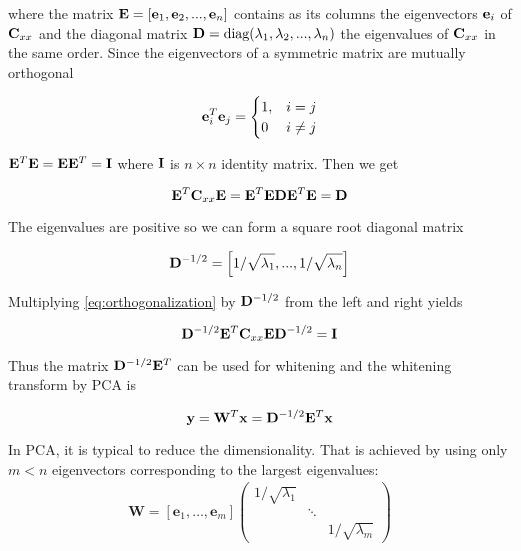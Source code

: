 \begin{enumerate}
\begin{solution}
\begin{enumerate}
      where the matrix $\mathbf{E}=\left[ \mathbf{e}_1, \mathbf{e}_2, ...,
        \mathbf{e}_n \right]$ contains as its columns the
      eigenvectors $\mathbf{e}_i$ of $\mathbf{C}_{xx}$ and the diagonal matrix $\mathbf{D}=\text{diag}(\lambda_1,
      \lambda_2, ..., \lambda_n)$ the eigenvalues of $\mathbf{C}_{xx}$ in the same
      order. Since the eigenvectors of a symmetric matrix are mutually
      orthogonal

      \[
      \mathbf{e}_i^T\mathbf{e}_j = \begin{cases}1, &i=j\\0 &i\neq
        j\end{cases}
      \]


      $\mathbf{E}^T\mathbf{E} = \mathbf{E}\mathbf{E}^T = \mathbf{I}$ where
      $\mathbf{I}$ is $n\times n$ identity matrix. Then we get

      \begin{equation}
        \mathbf{E}^T\mathbf{C}_{xx}\mathbf{E} =
        \mathbf{E}^T\mathbf{E}\mathbf{D}\mathbf{E}^T\mathbf{E} = \mathbf{D}
        \label{eq:orthogonalization}
      \end{equation}
      
      The eigenvalues are positive so we can form a square root diagonal matrix

      \[
      \mathbf{D}^{-1/2} = \left[ 1/\sqrt{\lambda_1}, ..., 1/\sqrt{\lambda_n} \right]
      \]

      Multiplying \eqref{eq:orthogonalization} by $\mathbf{D}^{-1/2}$
      from the left and right yields

      \[
      \mathbf{D}^{-1/2}\mathbf{E}^T\mathbf{C}_{xx}\mathbf{E}\mathbf{D}^{-1/2}=\mathbf{I}
      \]

      Thus the matrix $\mathbf{D}^{-1/2}\mathbf{E}^T$ can be used for whitening
      and the whitening transform by PCA is

      \[
      \textbf{y}=\mathbf{W}^T\mathbf{x} = \mathbf{D}^{-1/2}\mathbf{E}^T\mathbf{x}
      \]

      In PCA, it is typical to reduce the dimensionality. That is
      achieved by using only $m<n$ eigenvectors corresponding to the
      largest eigenvalues:
      \begin{align*}
        \mathbf{W} = [\mathbf{e}_1, \ldots, \mathbf{e}_m]
        \begin{pmatrix}
          1/\sqrt{\lambda_1} & &
          \\
          & \ddots &
          \\
          && 1/\sqrt{\lambda_m} 
        \end{pmatrix}
      \end{align*}
      

\end{enumerate}
\end{solution}
\end{enumerate}
